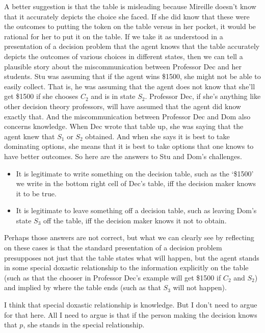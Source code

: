 \documentclass[11pt,]{book}
\providecommand{\tightlist}{%
  \setlength{\itemsep}{0pt}\setlength{\parskip}{0pt}}
\begin{document}
A better suggestion is that the table is misleading because Mireille doesn't know that it accurately depicts the choice she faced. If she did know that these were the outcomes to putting the token on the table versus in her pocket, it would be rational for her to put it on the table. If we take it as understood in a presentation of a decision problem that the agent knows that the table accurately depicts the outcomes of various choices in different states, then we can tell a plausible story about the miscommunication between Professor Dec and her students. Stu was assuming that if the agent wins \$1500, she might not be able to easily collect. That is, he was assuming that the agent does not know that she'll get \$1500 if she chooses \(C_2\) and is in state \(S_2\). Professor Dec, if she's anything like other decision theory professors, will have assumed that the agent did know exactly that. And the miscommunication between Professor Dec and Dom also concerns knowledge. When Dec wrote that table up, she was saying that the agent knew that \(S_1\) or \(S_2\) obtained. And when she says it is best to take dominating options, she means that it is best to take options that one knows to have better outcomes. So here are the answers to Stu and Dom's challenges.

\begin{itemize}
\tightlist
\item
  It is legitimate to write something on the decision table, such as the `\$1500' we write in the bottom right cell of Dec's table, iff the decision maker knows it to be true.
\item
  It is legitimate to leave something off a decision table, such as leaving Dom's state \(S_3\) off the table, iff the decision maker knows it not to obtain.
\end{itemize}

Perhaps those answers are not correct, but what we can clearly see by reflecting on these cases is that the standard presentation of a decision problem presupposes not just that the table states what will happen, but the agent stands in some special doxastic relationship to the information explicitly on the table (such as that the chooser in Professor Dec's example will get \$1500 if \(C_2\) and \(S_2\)) and implied by where the table ends (such as that \(S_3\) will not happen).

I think that special doxastic relationship is knowledge. But I don't need to argue for that here. All I need to argue is that if the person making the decision knows that \(p\), she stands in the special relationship.
\end{document}
